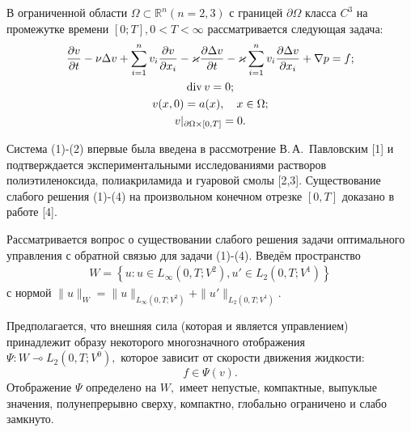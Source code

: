 
\vzmscaption

В ограниченной области $\Omega\subset \mathbb{R}^n (n=2,3)$ с границей $\partial\Omega$ класса $C^3$ на промежутке времени $[0;T], 0<T<\infty$ рассматривается следующая задача:
\begin{gather}
\frac{\partial v}{\partial t}-\nu\Delta v+\sum_{i=1}^n v_i\frac{\partial v}{\partial x_i}-\varkappa\frac{\partial\Delta v}{\partial t}-\varkappa\sum_{i=1}^n v_i\frac{\partial\Delta v}{\partial x_i}+\nabla p=f; \label{Ustiuzhaninova1} \\
{\rm div}\, v=0; \label{Ustiuzhaninova2}\\
v(x,0)=a(x), \quad x\in\Omega; \label{Ustiuzhaninova3}\\
v|_{\partial\Omega\times[0,T]}=0. \label{Ustiuzhaninova4}
\end{gather}

Система (1)-(2) впервые была введена в рассмотрение В.\,А.~Павловским [1] и подтверждается экспериментальными исследованиями растворов полиэтиленоксида, полиакриламида и гуаровой смолы [2,3]. Существование слабого решения (1)-(4) на произвольном конечном отрезке $[0,T]$ доказано в работе [4].

Рассматривается вопрос о существовании слабого решения задачи оптимального управления с обратной связью для задачи (1)-(4). Введём пространство 
\begin{gather*}
W=\left\{u: u\in L_\infty(0,T;V^2), u'\in L_2(0,T;V^1) \right\}
\end{gather*} 
с нормой $\|u\|_{W}= \|u\|_{L_\infty(0,T;V^2)}+\|u'\|_{L_2(0,T;V^1)}.$


Предполагается, что внешняя сила (которая и является управлением) принадлежит образу некоторого многозначного отображения $\Psi:W \multimap L_2(0,T;V^0),$ которое зависит от скорости движения жидкости:
\begin{equation}
\label{Ustiuzhaninova5}
f\in \Psi (v).
\end{equation}
Отображение $\Psi$ определено на $W,$ имеет непустые, компактные, выпуклые значения, полунепрерывно сверху, компактно, глобально ограничено и слабо замкнуто.

